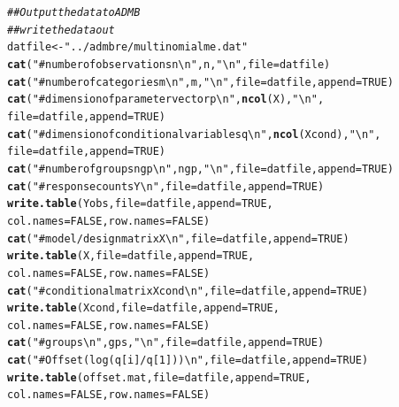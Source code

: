 \documentclass[12pt]{article}\usepackage[]{graphicx}\usepackage[]{color}
\makeatletter
\newcommand{\hlnum}[1]{\textcolor[rgb]{0.686,0.059,0.569}{#1}}%
\newcommand{\hlstr}[1]{\textcolor[rgb]{0.192,0.494,0.8}{#1}}%
\newcommand{\hlcom}[1]{\textcolor[rgb]{0.678,0.584,0.686}{\textit{#1}}}%
\newcommand{\hlstd}[1]{\textcolor[rgb]{0.345,0.345,0.345}{#1}}%
\newcommand{\hlkwb}[1]{\textcolor[rgb]{0.69,0.353,0.396}{#1}}%
\newcommand{\hlkwc}[1]{\textcolor[rgb]{0.333,0.667,0.333}{#1}}%
\newcommand{\hlkwd}[1]{\textcolor[rgb]{0.737,0.353,0.396}{\textbf{#1}}}%
\newenvironment{kframe}{%
 \def\at@end@of@kframe{}%
 \ifinner\ifhmode%
  \def\at@end@of@kframe{\end{minipage}}%
  \begin{minipage}{\columnwidth}%
 \fi\fi%
 \def\FrameCommand##1{\hskip\@totalleftmargin \hskip-\fboxsep
 \colorbox{shadecolor}{##1}\hskip-\fboxsep
     \hskip-\linewidth \hskip-\@totalleftmargin \hskip\columnwidth}%
 \MakeFramed {\advance\hsize-\width
   \@totalleftmargin\z@ \linewidth\hsize
   \@setminipage}}%
 {\par\unskip\endMakeFramed%
 \at@end@of@kframe}
\newenvironment{knitrout}{}{} %
\makeatother
\begin{document}
\begin{knitrout}
\begin{kframe}
\begin{alltt}
\hlcom{## Output the data to ADMB}
\hlcom{## write the data out}
\hlstd{datfile} \hlkwb{<-} \hlstr{"../admbre/multinomialme.dat"}
\hlkwd{cat}\hlstd{(}\hlstr{"# number of observations n \textbackslash{}n"}\hlstd{, n,} \hlstr{"\textbackslash{}n"}\hlstd{,} \hlkwc{file} \hlstd{= datfile)}
\hlkwd{cat}\hlstd{(}\hlstr{"# number of categories m \textbackslash{}n"}\hlstd{, m,} \hlstr{"\textbackslash{}n"}\hlstd{,} \hlkwc{file} \hlstd{= datfile,} \hlkwc{append} \hlstd{=} \hlnum{TRUE}\hlstd{)}
\hlkwd{cat}\hlstd{(}\hlstr{"# dimension of parameter vector p \textbackslash{}n"}\hlstd{,} \hlkwd{ncol}\hlstd{(X),} \hlstr{"\textbackslash{}n"}\hlstd{,}
    \hlkwc{file} \hlstd{= datfile,} \hlkwc{append} \hlstd{=} \hlnum{TRUE}\hlstd{)}
\hlkwd{cat}\hlstd{(}\hlstr{"# dimension of conditional variables q \textbackslash{}n"}\hlstd{,} \hlkwd{ncol}\hlstd{(Xcond),} \hlstr{"\textbackslash{}n"}\hlstd{,}
    \hlkwc{file} \hlstd{= datfile,} \hlkwc{append} \hlstd{=} \hlnum{TRUE}\hlstd{)}
\hlkwd{cat}\hlstd{(}\hlstr{"# number of groups ngp \textbackslash{}n"}\hlstd{, ngp,} \hlstr{"\textbackslash{}n"}\hlstd{,} \hlkwc{file} \hlstd{= datfile,} \hlkwc{append} \hlstd{=} \hlnum{TRUE}\hlstd{)}
\hlkwd{cat}\hlstd{(}\hlstr{"# response counts Y \textbackslash{}n"}\hlstd{,} \hlkwc{file} \hlstd{= datfile,} \hlkwc{append} \hlstd{=} \hlnum{TRUE}\hlstd{)}
\hlkwd{write.table}\hlstd{(Yobs,} \hlkwc{file} \hlstd{= datfile,} \hlkwc{append} \hlstd{=} \hlnum{TRUE}\hlstd{,}
            \hlkwc{col.names} \hlstd{=} \hlnum{FALSE}\hlstd{,} \hlkwc{row.names} \hlstd{=} \hlnum{FALSE}\hlstd{)}
\hlkwd{cat}\hlstd{(}\hlstr{"# model/design matrix X \textbackslash{}n"}\hlstd{,} \hlkwc{file} \hlstd{= datfile,} \hlkwc{append} \hlstd{=} \hlnum{TRUE}\hlstd{)}
\hlkwd{write.table}\hlstd{(X,} \hlkwc{file} \hlstd{= datfile,} \hlkwc{append} \hlstd{=} \hlnum{TRUE}\hlstd{,}
            \hlkwc{col.names} \hlstd{=} \hlnum{FALSE}\hlstd{,} \hlkwc{row.names} \hlstd{=} \hlnum{FALSE}\hlstd{)}
\hlkwd{cat}\hlstd{(}\hlstr{"# conditional matrix Xcond \textbackslash{}n"}\hlstd{,} \hlkwc{file} \hlstd{= datfile,} \hlkwc{append} \hlstd{=} \hlnum{TRUE}\hlstd{)}
\hlkwd{write.table}\hlstd{(Xcond,} \hlkwc{file} \hlstd{= datfile,} \hlkwc{append} \hlstd{=} \hlnum{TRUE}\hlstd{,}
            \hlkwc{col.names} \hlstd{=} \hlnum{FALSE}\hlstd{,} \hlkwc{row.names} \hlstd{=} \hlnum{FALSE}\hlstd{)}
\hlkwd{cat}\hlstd{(}\hlstr{"# groups \textbackslash{}n"}\hlstd{, gps,} \hlstr{"\textbackslash{}n"}\hlstd{,} \hlkwc{file} \hlstd{= datfile,} \hlkwc{append} \hlstd{=} \hlnum{TRUE}\hlstd{)}
\hlkwd{cat}\hlstd{(}\hlstr{"# Offset (log(q[i]/q[1])) \textbackslash{}n"}\hlstd{,} \hlkwc{file} \hlstd{= datfile,} \hlkwc{append} \hlstd{=} \hlnum{TRUE}\hlstd{)}
\hlkwd{write.table}\hlstd{(offset.mat,} \hlkwc{file} \hlstd{= datfile,} \hlkwc{append} \hlstd{=} \hlnum{TRUE}\hlstd{,}
            \hlkwc{col.names} \hlstd{=} \hlnum{FALSE}\hlstd{,} \hlkwc{row.names} \hlstd{=} \hlnum{FALSE}\hlstd{)}


\end{alltt}
\end{kframe}
\end{knitrout}
\end{document}
